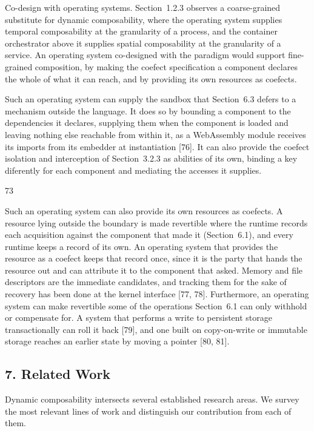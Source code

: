 \documentclass[
  10
]{article}
\begin{document}
Co-design with operating systems. Section~1.2.3 observes a
coarse-grained substitute for dynamic composability, where the operating
system supplies temporal composability at the granularity of a process,
and the container orchestrator above it supplies spatial composability
at the granularity of a service. An operating system co-designed with
the paradigm would support fine-grained composition, by making the
coefect specification a component declares the whole of what it can
reach, and by providing its own resources as coefects.

Such an operating system can supply the sandbox that Section~6.3 defers
to a mechanism outside the language. It does so by bounding a component
to the dependencies it declares, supplying them when the component is
loaded and leaving nothing else reachable from within it, as a
WebAssembly module receives its imports from its embedder at
instantiation {[}76{]}. It can also provide the coefect isolation and
interception of Section~3.2.3 as abilities of its own, binding a key
diferently for each component and mediating the accesses it supplies.

73

Such an operating system can also provide its own resources as coefects.
A resource lying outside the boundary is made revertible where the
runtime records each acquisition against the component that made it
(Section~6.1), and every runtime keeps a record of its own. An operating
system that provides the resource as a coefect keeps that record once,
since it is the party that hands the resource out and can attribute it
to the component that asked. Memory and file descriptors are the
immediate candidates, and tracking them for the sake of recovery has
been done at the kernel interface {[}77, 78{]}. Furthermore, an
operating system can make revertible some of the operations Section~6.1
can only withhold or compensate for. A system that performs a write to
persistent storage transactionally can roll it back {[}79{]}, and one
built on copy-on-write or immutable storage reaches an earlier state by
moving a pointer {[}80, 81{]}.

\subsection{7. Related Work}\label{related-work}

Dynamic composability intersects several established research areas. We
survey the most relevant lines of work and distinguish our contribution
from each of them.
\end{document}
